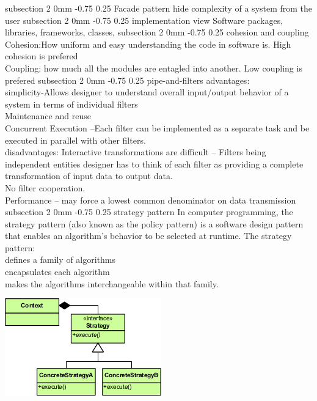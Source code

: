 \documentclass[a4paper,11pt]{article}
\makeatletter
\renewcommand{\subsection}{\@startsection
   {subsection}%
   {2}%
   {0mm}%
   {-0.75\baselineskip}%
   {0.25\baselineskip}%
   {\rmfamily\normalfont\slshape\normalsize}}%
\makeatother
\begin{document}
\subsection{Facade pattern}
hide complexity of a system from the user
\subsection{implementation view}
Software packages, libraries, frameworks, classes,
 \subsection{cohesion and coupling}
 Cohesion:How uniform and easy understanding the code in software is. High cohesion is prefered
 \\Coupling: how much all the modules are entagled into another. Low coupling is prefered
 \subsection{pipe-and-filters}
 advantages:
 \\simplicity-Allows designer to understand overall input/output behavior of a system in terms of individual filters
 \\Maintenance and reuse
 \\Concurrent Execution –Each filter can be implemented as a separate task and be executed in parallel with other filters.\\
 disadvantages:
 Interactive transformations are difficult – Filters being independent entities designer has to think of each filter as providing a complete transformation of input data to output data.
 \\No filter cooperation.
 \\Performance – may force a lowest common denominator on data transmission
 \subsection{strategy pattern}
 In computer programming, the strategy pattern (also known as the policy pattern) is a software design pattern that enables an algorithm's behavior to be selected at runtime. The strategy pattern:
 \\
defines a family of algorithms\\
encapsulates each algorithm\\
makes the algorithms interchangeable within that family.\\
\centerline{\includegraphics[scale=0.6]{Strategy}}
\end{document}
